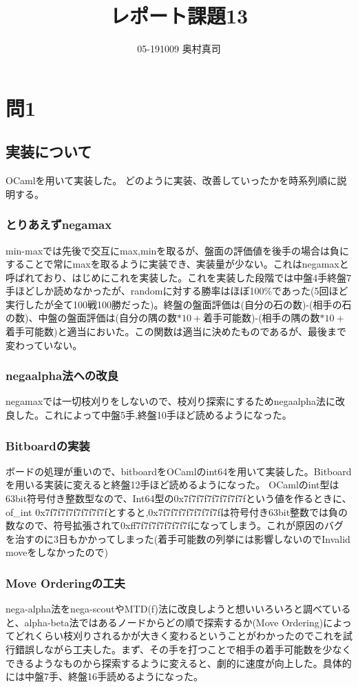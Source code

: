 \documentclass[11pt,a4paper]{jsarticle}
\title{レポート課題13}
\author{05-191009 奥村真司}
\date{}
\begin{document}
\maketitle
%
%
\section*{問1}
\subsection*{実装について}
OCamlを用いて実装した。
どのように実装、改善していったかを時系列順に説明する。
\subsubsection*{とりあえずnegamax}
min-maxでは先後で交互にmax,minを取るが、盤面の評価値を後手の場合は負にすることで常にmaxを取るように実装でき、実装量が少ない。これはnegamaxと呼ばれており、はじめにこれを実装した。これを実装した段階では中盤4手終盤7手ほどしか読めなかったが、randomに対する勝率はほぼ100\%であった(5回ほど実行したが全て100戦100勝だった)。終盤の盤面評価は(自分の石の数)-(相手の石の数)、中盤の盤面評価は(自分の隅の数$*10+$着手可能数)-(相手の隅の数$*10+$着手可能数)と適当においた。この関数は適当に決めたものであるが、最後まで変わっていない。
\subsubsection*{negaalpha法への改良}
negamaxでは一切枝刈りをしないので、枝刈り探索にするためnegaalpha法に改良した。これによって中盤5手,終盤10手ほど読めるようになった。
\subsubsection*{Bitboardの実装}
ボードの処理が重いので、bitboardをOCamlのint64を用いて実装した。Bitboardを用いる実装に変えると終盤12手ほど読めるようになった。
OCamlのint型は63bit符号付き整数型なので、Int64型の0x7f7f7f7f7f7f7f7fという値を作るときに、of\_int 0x7f7f7f7f7f7f7f7fとすると,0x7f7f7f7f7f7f7f7fは符号付き63bit整数では負の数なので、符号拡張されて0xff7f7f7f7f7f7f7fになってしまう。これが原因のバグを治すのに3日もかかってしまった(着手可能数の列挙には影響しないのでInvalid moveをしなかったので)
\subsubsection*{Move Orderingの工夫}
nega-alpha法をnega-scoutやMTD(f)法に改良しようと想いいろいろと調べていると、alpha-beta法ではあるノードからどの順で探索するか(Move Ordering)によってどれくらい枝刈りされるかが大きく変わるということがわかったのでこれを試行錯誤しながら工夫した。まず、その手を打つことで相手の着手可能数を少なくできるようなものから探索するように変えると、劇的に速度が向上した。具体的には中盤7手、終盤16手読めるようになった。
\end{document}
